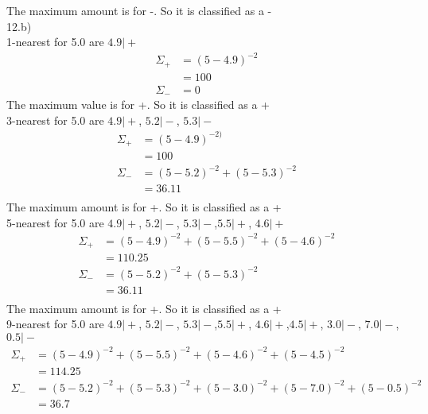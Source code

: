 \documentclass[12pt,english]{article}
\begin{document}
The maximum amount is for -. So it is classified as a -\\
12.b)\\
1-nearest for 5.0 are $4.9 \vert +$
\begin{equation*}
\begin{split}
\Sigma_+ &= ( 5 -4.9 )^{-2}\\
&= 100\\
\Sigma_- &= 0
\end{split}
\end{equation*}
The maximum value is for +. So it is classified as a +\\
3-nearest for 5.0 are $4.9 \vert +$, $5.2 \vert -$, $5.3 \vert -$
\begin{equation*}
\begin{split}
\Sigma_+ &= ( 5 - 4.9 )^{-2)}\\
&= 100\\
\Sigma_- &= ( 5 - 5.2 )^{-2} +( 5 - 5.3 )^{-2}\\
&= 36.11\\
\end{split}
\end{equation*}
The maximum amount is for +. So it is classified as a +\\
5-nearest for 5.0 are $4.9 \vert +$, $5.2 \vert -$, $5.3 \vert -$,$5.5 \vert +$, $4.6 \vert +$
\begin{equation*}
\begin{split}
\Sigma_+ &= ( 5 - 4.9 )^{-2} +( 5 - 5.5 )^{-2} +( 5 - 4.6 )^{-2}\\
&= 110.25\\
\Sigma_- &= ( 5 - 5.2 )^{-2} +( 5 - 5.3 )^{-2}\\
&= 36.11\\
\end{split}
\end{equation*}
The maximum amount is for +. So it is classified as a +\\
9-nearest for 5.0 are $4.9 \vert +$, $5.2 \vert -$, $5.3 \vert -$,$5.5 \vert +$, $4.6 \vert +$,$4.5 \vert +$, $3.0 \vert -$, $7.0 \vert -$,$0.5 \vert -$
\begin{equation*}
\begin{split}
\Sigma_+ &= ( 5 - 4.9 )^{-2} +( 5 - 5.5 )^{-2} +( 5 - 4.6 )^{-2}+( 5 - 4.5 )^{-2}\\
&= 114.25\\
\Sigma_- &= ( 5 - 5.2 )^{-2} +( 5 - 5.3 )^{-2}+( 5 - 3.0 )^{-2}+( 5 - 7.0 )^{-2}+( 5 - 0.5 )^{-2}\\
&= 36.7\\
\end{split}
\end{equation*}
\end{document}

